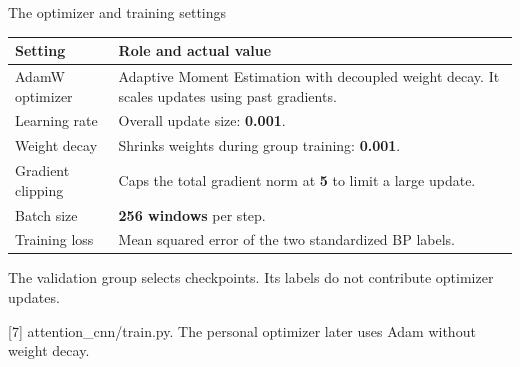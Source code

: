 \documentclass[aspectratio=169,11pt]{beamer}
\newcommand{\source}[1]{\vfill\par{\fontsize{7}{8}\selectfont\color{Muted}#1}}
\newcommand{\smalltable}{\fontsize{9}{11}\selectfont\renewcommand{\arraystretch}{1.18}}
\begin{document}
\begin{frame}{The optimizer and training settings}
\smalltable
\begin{tabular}{P{3.6cm}P{9.1cm}}\toprule
Setting & Role and actual value\\\midrule
AdamW optimizer & Adaptive Moment Estimation with decoupled weight decay. It scales updates using past gradients.\\[2mm]
Learning rate & Overall update size: \textbf{0.001}.\\
Weight decay & Shrinks weights during group training: \textbf{0.001}.\\
Gradient clipping & Caps the total gradient norm at \textbf{5} to limit a large update.\\
Batch size & \textbf{256 windows} per step.\\
Training loss & Mean squared error of the two standardized BP labels.\\\bottomrule
\end{tabular}
\par\medskip The validation group selects checkpoints. Its labels do not contribute optimizer updates.
\source{[7] attention\_cnn/train.py. The personal optimizer later uses Adam without weight decay.}
\end{frame}
\end{document}
